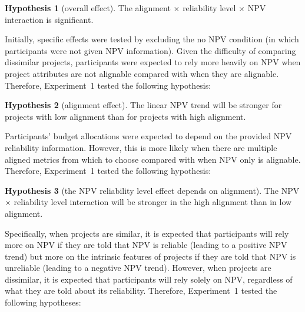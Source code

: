 \documentclass[a4paper, nobind]{templates/ociamthesis}
\theoremstyle{definition}
\theoremstyle{definition}
\theoremstyle{definition}
\theoremstyle{definition}
\newtheorem{hypothesis}{Hypothesis}[chapter]
\theoremstyle{remark}
\begin{document}
\begin{hypothesis}[overall effect]
\protect\hypertarget{hyp:three-way-alignment-2}{}{\label{hyp:three-way-alignment-2} \iffalse (overall effect) \fi{} }The alignment \(\times\) reliability level \(\times\) NPV interaction is
significant.
\end{hypothesis}

Initially, specific effects were tested by excluding the no NPV condition (in
which participants were not given NPV information). Given the difficulty of
comparing dissimilar projects, participants were expected to rely more heavily
on NPV when project attributes are not alignable compared with when they are
alignable. Therefore, Experiment~1 tested the following hypothesis:

\begin{hypothesis}[alignment effect]
\protect\hypertarget{hyp:allocation-alignment-alignment-2}{}{\label{hyp:allocation-alignment-alignment-2} \iffalse (alignment effect) \fi{} }The linear NPV trend will be stronger for projects with low alignment than for
projects with high alignment.
\end{hypothesis}

Participants' budget allocations were expected to depend on the provided NPV
reliability information. However, this is more likely when there are multiple
aligned metrics from which to choose compared with when NPV only is alignable.
Therefore, Experiment~1 tested the following hypothesis:

\begin{hypothesis}[the NPV reliability level effect depends on alignment]
\protect\hypertarget{hyp:allocation-alignment-reliability-npv-alignment-2}{}{\label{hyp:allocation-alignment-reliability-npv-alignment-2} \iffalse (the NPV reliability level effect depends on alignment) \fi{} }The NPV \(\times\) reliability level interaction will be stronger in the high
alignment than in low alignment.
\end{hypothesis}

Specifically, when projects are similar, it is expected that participants will
rely more on NPV if they are told that NPV is reliable (leading to a positive
NPV trend) but more on the intrinsic features of projects if they are told that
NPV is unreliable (leading to a negative NPV trend). However, when projects are
dissimilar, it is expected that participants will rely solely on NPV, regardless
of what they are told about its reliability. Therefore, Experiment~1 tested the
following hypotheses:
\end{document}
